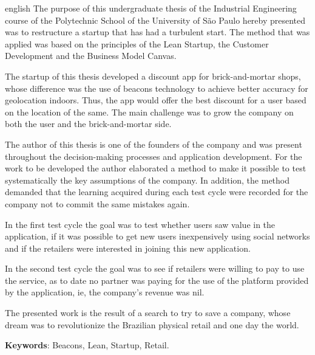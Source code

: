 \setlength{\absparsep}{18pt} %
\begin{resumo}[Abstract]
 \begin{otherlanguage*}{english}
The purpose of this undergraduate thesis of the Industrial Engineering course of the Polytechnic School of the University of São Paulo hereby presented was to restructure a startup that has had a turbulent start. The method that was applied was based on the principles of the Lean Startup, the Customer Development and the Business Model Canvas.

The startup of this thesis developed a discount app for brick-and-mortar shops, whose difference was the use of beacons technology to achieve better accuracy for geolocation indoors. Thus, the app would offer the best discount for a user based on the location of the same. The main challenge was to grow the company on both the user and the brick-and-mortar side.

The author of this thesis is one of the founders of the company and was present throughout the decision-making processes and application development. For the work to be developed the author elaborated a method to make it possible to test systematically the key assumptions of the company. In addition, the method demanded that the learning acquired during each test cycle were recorded for the company not to commit the same mistakes again.

In the first test cycle the goal was to test whether users saw value in the application, if it was possible to get new users inexpensively using social networks and if the retailers were interested in joining this new application.

In the second test cycle the goal was to see if retailers were willing to pay to use the service, as to date no partner was paying for the use of the platform provided by the application, ie, the company's revenue was nil.

The presented work is the result of a search to try to save a company, whose dream was to revolutionize the Brazilian physical retail and one day the world.

   \vspace{\onelineskip}
 
   \noindent 
   \textbf{Keywords}: Beacons, Lean, Startup, Retail.
 \end{otherlanguage*}
\end{resumo}
